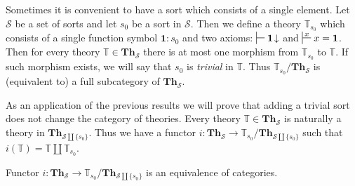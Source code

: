\documentclass[reqno]{amsart}
\theoremstyle{definition}
\theoremstyle{remark}
\newcommand{\cat}[1]{\mathbf{#1}}
\newcommand{\Th}{\cat{Th}}
\newcommand{\emptyCtx}{\mathbf{1}}
\numberwithin{figure}{section}
\begin{document}
Sometimes it is convenient to have a sort which consists of a single element.
Let $\mathcal{S}$ be a set of sorts and let $s_0$ be a sort in $\mathcal{S}$.
Then we define a theory $\mathbb{T}_{s_0}$ which consists of a single function symbol $\emptyCtx : s_0$
    and two axioms: $\sststile{}{} \emptyCtx\!\downarrow$ and $\sststile{}{x} x = \emptyCtx$.
Then for every theory $\mathbb{T} \in \Th_\mathcal{S}$ there is at most one morphism from $\mathbb{T}_{s_0}$ to $\mathbb{T}$.
If such morphism exists, we will say that $s_0$ is \emph{trivial} in $\mathbb{T}$.
Thus $\mathbb{T}_{s_0}/\Th_\mathcal{S}$ is (equivalent to) a full subcategory of $\Th_\mathcal{S}$.

As an application of the previous results we will prove that adding a trivial sort does not change the category of theories.
Every theory $\mathbb{T} \in \Th_\mathcal{S}$ is naturally a theory in $\Th_{\mathcal{S} \amalg \{ s_0 \}}$.
Thus we have a functor $i : \Th_\mathcal{S} \to \mathbb{T}_{s_0}/\Th_{\mathcal{S} \amalg \{ s_0 \}}$ such that $i(\mathbb{T}) = \mathbb{T} \amalg \mathbb{T}_{s_0}$.
\begin{prop}
Functor $i : \Th_\mathcal{S} \to \mathbb{T}_{s_0}/\Th_{\mathcal{S} \amalg \{ s_0 \}}$ is an equivalence of categories.
\end{prop}
\end{document}
